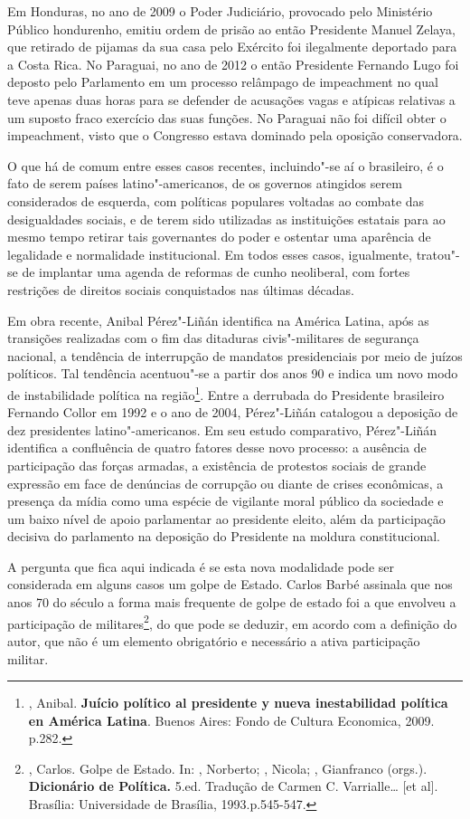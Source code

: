 Em Honduras, no ano de 2009 o Poder Judiciário, provocado pelo
Ministério Público hondurenho, emitiu ordem de prisão ao então
Presidente Manuel Zelaya, que retirado de pijamas da sua casa pelo
Exército foi ilegalmente deportado para a Costa Rica. No Paraguai, no
ano de 2012 o então Presidente Fernando Lugo foi deposto pelo Parlamento
em um processo relâmpago de impeachment no qual teve apenas duas horas
para se defender de acusações vagas e atípicas relativas a um suposto
fraco exercício das suas funções. No Paraguai não foi difícil obter o
impeachment, visto que o Congresso estava dominado pela oposição
conservadora.

O que há de comum entre esses casos recentes, incluindo"-se aí o
brasileiro, é o fato de serem países latino"-americanos, de os governos
atingidos serem considerados de esquerda, com políticas populares
voltadas ao combate das desigualdades sociais, e de terem sido
utilizadas as instituições estatais para ao mesmo tempo retirar tais
governantes do poder e ostentar uma aparência de legalidade e
normalidade institucional. Em todos esses casos, igualmente, tratou"-se
de implantar uma agenda de reformas de cunho neoliberal, com fortes
restrições de direitos sociais conquistados nas últimas décadas.

Em obra recente, Anibal Pérez"-Liñán identifica na América Latina, após
as transições realizadas com o fim das ditaduras civis"-militares de
segurança nacional, a tendência de interrupção de mandatos presidenciais
por meio de juízos políticos. Tal tendência acentuou"-se a partir dos
anos 90 e indica um novo modo de instabilidade política na
região\footnote{, Anibal. \textbf{Juício político al
  presidente y nueva inestabilidad política en América Latina}. Buenos
  Aires: Fondo de Cultura Economica, 2009. p.282.}. Entre a derrubada do
Presidente brasileiro Fernando Collor em 1992 e o ano de 2004,
Pérez"-Liñán catalogou a deposição de dez presidentes latino"-americanos.
Em seu estudo comparativo, Pérez"-Liñán identifica a confluência de
quatro fatores desse novo processo: a ausência de participação das
forças armadas, a existência de protestos sociais de grande expressão em
face de denúncias de corrupção ou diante de crises econômicas, a
presença da mídia como uma espécie de vigilante moral público da
sociedade e um baixo nível de apoio parlamentar ao presidente eleito,
além da participação decisiva do parlamento na deposição do Presidente
na moldura constitucional.

A pergunta que fica aqui indicada é se esta nova modalidade pode ser
considerada em alguns casos um golpe de Estado. Carlos Barbé assinala
que nos anos 70 do século  a forma mais frequente de golpe de estado
foi a que envolveu a participação de militares\footnote{, Carlos.
  Golpe de Estado. In: , Norberto; , Nicola; ,
  Gianfranco (orgs.). \textbf{Dicionário de Política.} 5.ed. Tradução de
  Carmen C. Varrialle\ldots{} {[}et al{]}. Brasília: Universidade de
  Brasília, 1993.p.545-547.}, do que pode se deduzir, em acordo com a
definição do autor, que não é um elemento obrigatório e necessário a
ativa participação militar.

